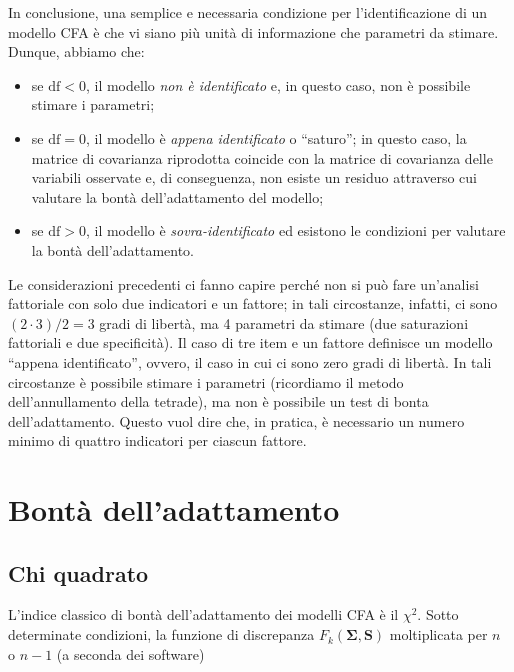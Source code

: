\documentclass[
  11pt,
]{krantz}
\providecommand{\tightlist}{%
  \setlength{\itemsep}{0pt}\setlength{\parskip}{0pt}}
\theoremstyle{definition}
\theoremstyle{definition}
\theoremstyle{definition}
\theoremstyle{definition}
\theoremstyle{remark}
\begin{document}
In conclusione, una semplice e necessaria condizione per l'identificazione di un modello CFA è che vi siano più unità di informazione che parametri da stimare. Dunque, abbiamo che:

\begin{itemize}
\tightlist
\item
  se \(\mbox{df} < 0\), il modello \emph{non è identificato} e, in questo caso, non è possibile stimare i parametri;
\item
  se \(\mbox{df} = 0\), il modello è \emph{appena identificato} o ``saturo''; in questo caso, la matrice di covarianza riprodotta coincide con la matrice di covarianza delle variabili osservate e, di conseguenza, non esiste un residuo attraverso cui valutare la bontà dell'adattamento del modello;
\item
  se \(\mbox{df} > 0\), il modello è \emph{sovra-identificato} ed esistono le condizioni per valutare la bontà dell'adattamento.
\end{itemize}

Le considerazioni precedenti ci fanno capire perché non si può fare un'analisi fattoriale con solo due indicatori e un fattore; in tali circostanze, infatti, ci sono \((2 \cdot 3)/2 = 3\) gradi di libertà, ma 4 parametri da stimare (due saturazioni fattoriali e due specificità). Il caso di tre item e un fattore definisce un modello ``appena identificato'', ovvero, il caso in cui ci sono zero gradi di libertà. In tali circostanze è possibile stimare i parametri (ricordiamo il metodo dell'annullamento della tetrade), ma non è possibile un test di bonta dell'adattamento. Questo vuol dire che, in pratica, è necessario un numero minimo di quattro indicatori per ciascun fattore.

\hypertarget{bontuxe0-delladattamento}{%
\section{Bontà dell'adattamento}\label{bontuxe0-delladattamento}}

\hypertarget{chi-quadrato}{%
\subsection{Chi quadrato}\label{chi-quadrato}}

L'indice classico di bontà dell'adattamento dei modelli CFA è il \(\chi^2\). Sotto determinate condizioni, la funzione di discrepanza \(F_{k}(\boldsymbol{\Sigma}, \boldsymbol{S})\) moltiplicata per \(n\) o \(n-1\) (a seconda dei software)
\end{document}
